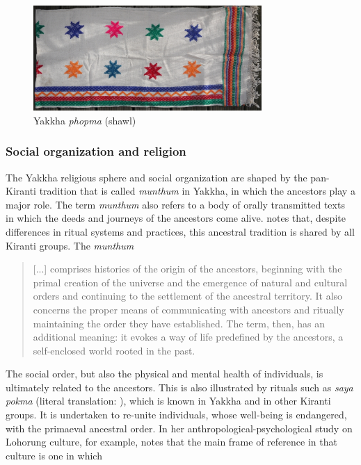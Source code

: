 \begin{figure}[t]
\centering
\includegraphics[height=4cm]{figures/phopma.jpg}
\caption{Yakkha \emph{phopma} (shawl)}\label{phopma}
\end{figure}

\subsubsection{Social organization and religion}\label{social}

The Yakkha religious sphere and social organization are shaped by the pan-Ki\-ran\-ti tradition that is called \emph{munthum} in Yakkha, in which the ancestors play a major role. The term \emph{munthum} also refers to a body of orally transmitted texts in which the deeds and journeys of the ancestors come alive. \citet{Gaenszle_Redefining} notes that, despite differences in ritual systems and practices, this ancestral tradition is shared by  all Kiranti groups. The \emph{munthum}

\begin{quote}
[...] comprises histories of the origin of the ancestors, beginning with the primal creation of the universe and the emergence of natural and cultural orders and continuing to the settlement of the ancestral territory. It also concerns the proper means of communicating with ancestors and ritually maintaining the order they have established. The term, then, has an additional meaning: it evokes a way of life predefined by the ancestors, a self-enclosed world rooted in the past. \citep[224]{Gaenszle2000Origins}
\end{quote}

The social order, but also the physical and mental health of individuals, is ultimately related to the ancestors. This is also illustrated by rituals such as \emph{saya pokma} (literal translation: ), which is known in Yakkha and in other Kiranti groups. It is undertaken to re-unite individuals, whose well-being is endangered, with the primaeval ancestral order. In her anthropological-psychological study on Lohorung culture, for example, \citet{Hardman2000_Other} notes that the main frame of reference in that culture is one in which

